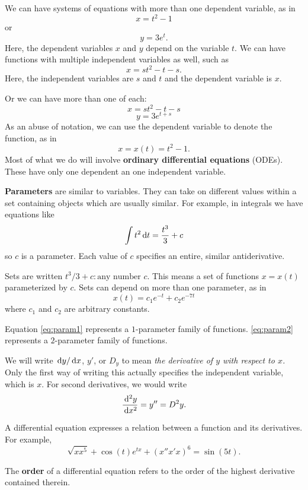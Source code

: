 We can have systems of equations with more than one dependent variable, as in
\[ x =t^2 -1 \]
or
\[ y=3e^t. \]
Here, the dependent variables $x$ and $y$ depend on the variable $t$.
We can have functions with multiple independent variables as well, such as
\[ x=st^2 -t -s. \]
Here, the independent variables are $s$ and $t$ and the dependent variable is $x$.

Or we can have more than one of each:
\[ x =st^2 -t -s \]
\[ y=3e^{t+s} \]
As an abuse of notation, we can use the dependent variable to denote the function, as in
\[ x=x(t)=t^2 -1.\]
Most of what we do will involve \textbf{ordinary differential equations} (ODEs).
These have only one dependent an one independent variable.

\textbf{Parameters} are similar to variables.
They can take on different values within a set containing objects which are usually similar.
For example, in integrals we have equations like
\begin{equation}
  \int t^2 \,\mathrm{d} t = \frac{t^3}{3}+c
  \label{eq:param1}
\end{equation}
so $c$ is a parameter. Each value of $c$ specifies an entire, similar antiderivative.

Sets are written ${t^3 /3 +c : \text{any number $c$}}$.
This means a set of functions $x=x(t)$ parameterized by $c$.
Sets can depend on more than one parameter, as in
\begin{equation}
  x(t)=c_1 e^{-t}+c_2 e^{-7t}
  \label{eq:param2}
\end{equation}
where $c_1$ and $c_2$ are arbitrary constants.

Equation \eqref{eq:param1} represents a $1$-parameter family of functions.
\eqref{eq:param2} represents a $2$-parameter family of functions.

We will write $\,\mathrm{d} y / \,\mathrm{d} x$, $y'$, or $D_y$ to mean {\em the derivative of $y$ with respect to $x$.}
  Only the first way of writing this actually specifies the independent variable, which is $x$.
For second derivatives, we would write
\[ \frac{\,\mathrm{d} ^2 y}{\,\mathrm{d} x^2}= y''=D^2 y. \]

A differential equation expresses a relation between a function and its derivatives.
For example,
\[ \sqrt{x x^{5}}+\cos{(t)}e^{tx} + (x'' x' x )^6 = \sin{(5t)}. \]

The \textbf{order} of a differential equation refers to the order of the highest derivative contained therein.

